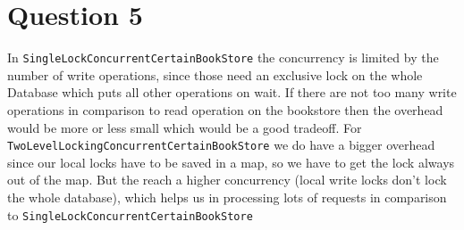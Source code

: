 \documentclass[12pt,a4paper]{article}
\begin{document}
\section{Question 5}
In \texttt{SingleLockConcurrentCertainBookStore} the concurrency is limited by the number of write operations, since those need an exclusive lock on the whole Database which puts all other operations on wait.
If there are not too many write operations in comparison to read operation on the bookstore then the overhead would be more or less small which would be a good tradeoff.
For \texttt{TwoLevelLockingConcurrentCertainBookStore} we do have a bigger overhead since our local locks have to be saved in a map, so we have to get the lock always out of the map.
But the reach a higher concurrency (local write locks don't lock the whole database), which helps us in processing lots of requests in comparison to \texttt{SingleLockConcurrentCertainBookStore}
\end{document}
